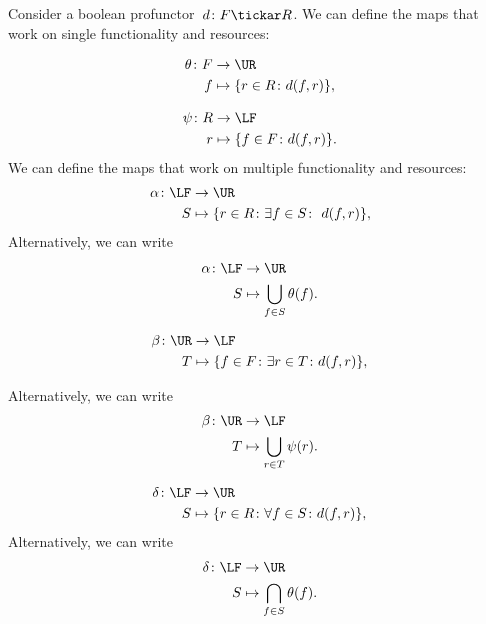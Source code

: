 Consider a boolean profunctor~$d\colon F\tickar R$. We can define the maps that work on single functionality and resources:

\begin{equation}
    \begin{aligned}
    \theta\colon F&\to \UR\\
    f&\mapsto \{r\in R \colon d(f, r) \},
    \end{aligned}
\end{equation}

\begin{equation}
    \begin{aligned}
    \psi\colon R&\to \LF\\
    r&\mapsto \{f\in F \colon d(f, r) \}.
    \end{aligned}
\end{equation}
We can define the maps that work on multiple functionality 
and resources:
\begin{equation}
\label{eq:galoisalfa}
    \begin{aligned}
    \alpha\colon \LF&\to \UR\\
    S&\mapsto \{r\in R \colon \exists f\in S\colon \ d(f,r)\},
    \end{aligned}
\end{equation}
Alternatively, we can write 
\begin{equation}
\begin{aligned}
\alpha \colon \LF &\to \UR \\
S&\mapsto \bigcup_{f\in S} \theta(f).
\end{aligned}
\end{equation}

\begin{equation}
\label{eq:galoisbeta}
    \begin{aligned}
    \beta\colon \UR&\to \LF\\
    T&\mapsto \{f\in F  \colon \exists r\in T\colon d(f,r)\},
    \end{aligned}
\end{equation}

\noindent Alternatively, we can write
\begin{equation}
\begin{aligned}
\beta \colon \UR &\to \LF \\
T&\mapsto \bigcup_{r\in T} \psi(r).
\end{aligned}
\end{equation}

\begin{equation}
\label{eq:galoisdelta}
    \begin{aligned}
    \delta \colon \LF&\to \UR\\
    S&\mapsto \{r\in R \colon \forall {f\in S}\colon d(f,r)\},
    \end{aligned}
\end{equation}
Alternatively, we can write
\begin{equation}
    \begin{aligned}
    \delta\colon \LF &\to \UR\\
    S&\mapsto \bigcap_{f\in S}\theta(f).
    \end{aligned}
\end{equation}

